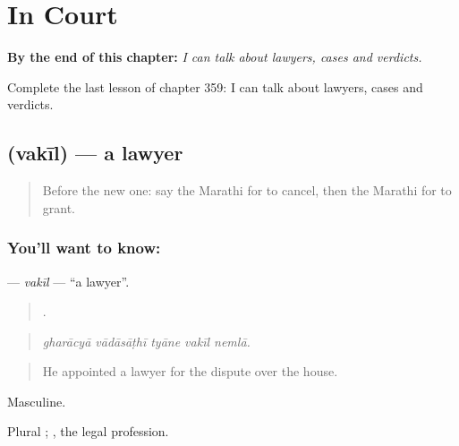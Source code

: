 
\chapter{In Court}
\label{ch:mr-in-court}

\begin{chapteropening}
\textbf{By the end of this chapter:} \emph{I can talk about lawyers, cases and verdicts.}

Complete the last lesson of chapter 359: I can talk about lawyers, cases and verdicts.
\end{chapteropening}

\section[\texorpdfstring{\mr{वकील} (vakīl)}{वकील (vakīl)}]{ (vakīl) — a lawyer}

\label{lesson:MR-C359-vakil}



\begin{quote}
Before the new one: say the Marathi for to cancel, then the Marathi for to grant.
\end{quote}

\subsection*{You'll want to know: }
\textbf{} — \emph{vakīl} — \textquotedblleft{}a lawyer\textquotedblright{}.

\begin{quote}
    .
\end{quote}

\begin{quote}
\emph{gharācyā vādāsāṭhī tyāne vakīl nemlā.}
\end{quote}

\begin{quote}
He appointed a lawyer for the dispute over the house.
\end{quote}

Masculine.

Plural ; , the legal profession.

